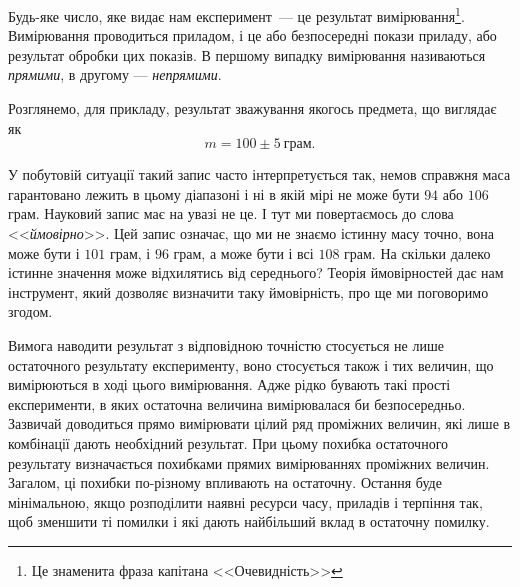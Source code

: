 \documentclass{LabBook}
\begin{document}
Будь-яке число, яке видає нам експеримент~--- це результат вимірювання\footnote{Це знаменита фраза капітана <<Очевидність>>}. Вимірювання проводиться приладом, і це або безпосередні покази приладу, або результат обробки цих показів. В першому випадку вимірювання називаються \emph{прямими}, в другому --- \emph{непрямими}.


Розглянемо, для прикладу, результат зважування якогось предмета, що виглядає як
\begin{equation}\label{}
  m = 100 \pm 5~\text{грам}.
\end{equation}

У побутовій ситуації такий запис часто інтерпретується так, немов справжня маса гарантовано лежить в цьому діапазоні і ні в якій мірі не може бути $94$ або $106$ грам. Науковий запис має на увазі не це. І тут ми повертаємось до слова <<\emph{ймовірно}>>. Цей запис означає, що ми не знаємо істинну масу точно, вона може бути і $101$ грам, і $96$ грам, а може бути і всі $108$ грам. На скільки далеко істинне значення може відхилятись від середнього? Теорія ймовірностей дає нам інструмент, який дозволяє визначити таку ймовірність, про ще ми поговоримо згодом.

Вимога наводити результат з відповідною точністю стосується не лише остаточного результату експерименту, воно стосується  також і тих величин, що вимірюються в ході цього вимірювання. Адже рідко бувають такі прості експерименти, в яких остаточна величина вимірювалася би безпосередньо. Зазвичай доводиться прямо вимірювати цілий ряд проміжних величин, які лише в комбінації дають необхідний результат. При цьому похибка остаточного результату визначається похибками прямих вимірюваннях проміжних величин. Загалом, ці похибки по-різному впливають на остаточну. Остання буде мінімальною, якщо розподілити наявні ресурси часу, приладів і терпіння так, щоб зменшити ті помилки і які дають найбільший вклад в остаточну помилку.

\end{document}
